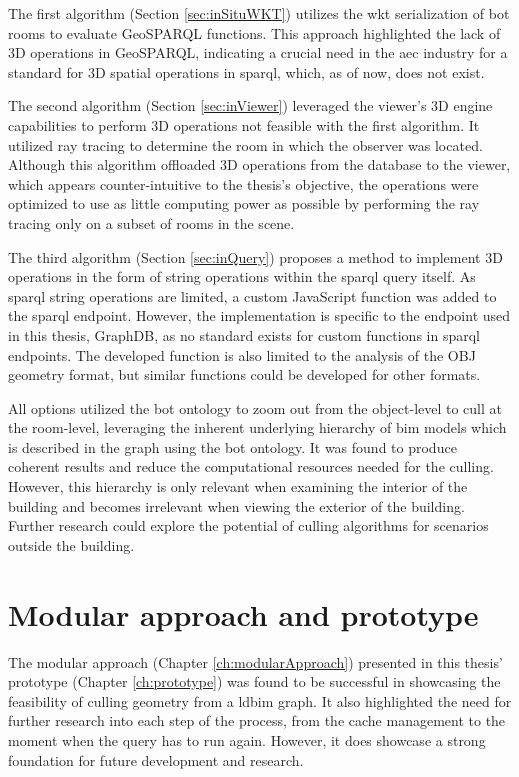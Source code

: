The first algorithm (Section \ref{sec:inSituWKT}) utilizes the \ac{wkt} serialization of \ac{bot} rooms to evaluate GeoSPARQL functions. This approach highlighted the lack of 3D operations in GeoSPARQL, indicating a crucial need in the \ac{aec} industry for a standard for 3D spatial operations in \ac{sparql}, which, as of now, does not exist.

The second algorithm (Section \ref{sec:inViewer}) leveraged the viewer's 3D engine capabilities to perform 3D operations not feasible with the first algorithm. It utilized ray tracing to determine the room in which the observer was located. Although this algorithm offloaded 3D operations from the database to the viewer, which appears counter-intuitive to the thesis's objective, the operations were optimized to use as little computing power as possible by performing the ray tracing only on a subset of rooms in the scene.

The third algorithm (Section \ref{sec:inQuery}) proposes a method to implement 3D operations in the form of string operations within the \ac{sparql} query itself. As \ac{sparql} string operations are limited, a custom JavaScript function was added to the \ac{sparql} endpoint. However, the implementation is specific to the endpoint used in this thesis, GraphDB, as no standard exists for custom functions in \ac{sparql} endpoints. The developed function is also limited to the analysis of the OBJ geometry format, but similar functions could be developed for other formats.

All options utilized the \ac{bot} ontology to zoom out from the object-level to cull at the room-level, leveraging the inherent underlying hierarchy of \ac{bim} models which is described in the graph using the \ac{bot} ontology. It was found to produce coherent results and reduce the computational resources needed for the culling. However, this hierarchy is only relevant when examining the interior of the building and becomes irrelevant when viewing the exterior of the building. Further research could explore the potential of culling algorithms for scenarios outside the building.

\section{Modular approach and prototype}
The modular approach (Chapter \ref{ch:modularApproach}) presented in this thesis' prototype (Chapter \ref{ch:prototype}) was found to be successful in showcasing the feasibility of culling geometry from a \ac{ldbim} graph. It also highlighted the need for further research into each step of the process, from the cache management to the moment when the query has to run again. However, it does showcase a strong foundation for future development and research.

